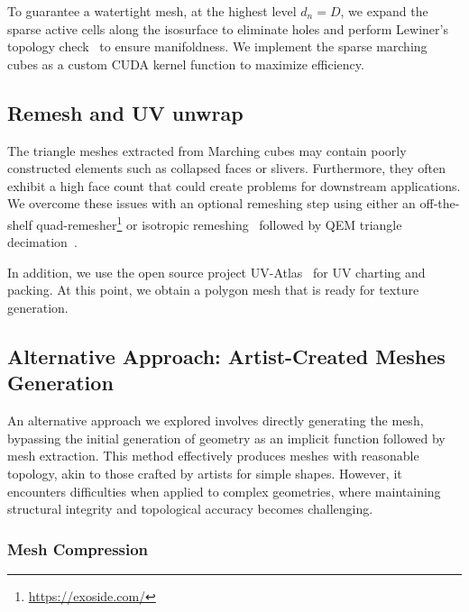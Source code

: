 To guarantee a watertight mesh, at the highest level $d_n=D$, we expand the sparse active cells along the isosurface to eliminate holes and perform Lewiner's topology check~\cite{lewiner2003efficient} to ensure manifoldness. We implement the sparse marching cubes as a custom CUDA kernel function to maximize efficiency.

\subsection{Remesh and UV unwrap} 
The triangle meshes extracted from Marching cubes may contain poorly constructed elements such as collapsed faces or slivers. Furthermore, they often exhibit a high face count that could create problems for downstream applications. We overcome these issues with an optional remeshing step using either an off-the-shelf quad-remesher\footnote{\url{https://exoside.com/}} or isotropic remeshing~\cite{pietroni2009almost} followed by QEM triangle decimation~\cite{garland1997surface}. 

In addition, we use the open source project UV-Atlas~\cite{zhou2004iso} for UV charting and packing. At this point, we obtain a polygon mesh that is ready for texture generation.

\subsection{Alternative Approach: Artist-Created Meshes Generation} %
An alternative approach we explored involves directly generating the mesh, bypassing the initial generation of geometry as an implicit function followed by mesh extraction. This method effectively produces meshes with reasonable topology, akin to those crafted by artists for simple shapes. However, it encounters difficulties when applied to complex geometries, where maintaining structural integrity and topological accuracy becomes challenging.

\subsubsection{Mesh Compression}

